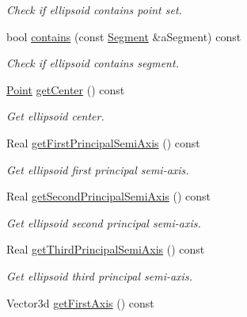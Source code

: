 \begin{DoxyCompactItemize}
\begin{DoxyCompactList}\small\item\em Check if ellipsoid contains point set. \end{DoxyCompactList}\item 
bool \hyperlink{classlibrary_1_1math_1_1geom_1_1d3_1_1objects_1_1_ellipsoid_a4b0c41a41fbd8f158da26825f04c47d5}{contains} (const \hyperlink{classlibrary_1_1math_1_1geom_1_1d3_1_1objects_1_1_segment}{Segment} \&a\+Segment) const
\begin{DoxyCompactList}\small\item\em Check if ellipsoid contains segment. \end{DoxyCompactList}\item 
\hyperlink{classlibrary_1_1math_1_1geom_1_1d3_1_1objects_1_1_point}{Point} \hyperlink{classlibrary_1_1math_1_1geom_1_1d3_1_1objects_1_1_ellipsoid_a646be2506950d250db0fb6610979bb46}{get\+Center} () const
\begin{DoxyCompactList}\small\item\em Get ellipsoid center. \end{DoxyCompactList}\item 
Real \hyperlink{classlibrary_1_1math_1_1geom_1_1d3_1_1objects_1_1_ellipsoid_a8219b05b4c6afcd71e915d10b6129baf}{get\+First\+Principal\+Semi\+Axis} () const
\begin{DoxyCompactList}\small\item\em Get ellipsoid first principal semi-\/axis. \end{DoxyCompactList}\item 
Real \hyperlink{classlibrary_1_1math_1_1geom_1_1d3_1_1objects_1_1_ellipsoid_abdc2cc0bed7d473f0d4f572afd0de054}{get\+Second\+Principal\+Semi\+Axis} () const
\begin{DoxyCompactList}\small\item\em Get ellipsoid second principal semi-\/axis. \end{DoxyCompactList}\item 
Real \hyperlink{classlibrary_1_1math_1_1geom_1_1d3_1_1objects_1_1_ellipsoid_a62b97423985083db726d34eced6b58ae}{get\+Third\+Principal\+Semi\+Axis} () const
\begin{DoxyCompactList}\small\item\em Get ellipsoid third principal semi-\/axis. \end{DoxyCompactList}\item 
Vector3d \hyperlink{classlibrary_1_1math_1_1geom_1_1d3_1_1objects_1_1_ellipsoid_a155ca01528d96ae76bfcbb155c832a20}{get\+First\+Axis} () const

\end{DoxyCompactItemize}
